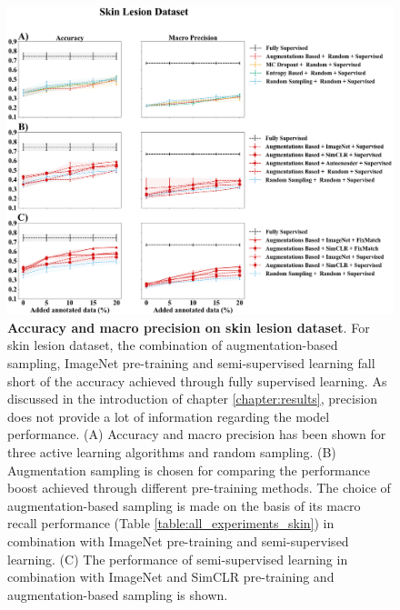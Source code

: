 \begin{figure}[htbp]
\centering
\captionsetup{format=plain}
\includegraphics[width=\textwidth]{figures/fig_2_skin_acc_precision.png}
\caption[Accuracy and macro precision on skin lesion dataset]{\textbf{Accuracy and macro precision on skin lesion dataset}. For skin lesion dataset, the combination of augmentation-based sampling, ImageNet pre-training and semi-supervised learning fall short of the accuracy achieved through fully supervised learning. As discussed in the introduction of chapter \ref{chapter:results}, precision does not provide a lot of information regarding the model performance. (A) Accuracy and macro precision has been shown for three active learning algorithms and random sampling. (B) Augmentation sampling is chosen for comparing the performance boost achieved through different pre-training methods. The choice of augmentation-based sampling is made on the basis of its macro recall performance (Table \ref{table:all_experiments_skin}) in combination with ImageNet pre-training and semi-supervised learning. (C) The performance of semi-supervised learning in combination with ImageNet and SimCLR pre-training and augmentation-based sampling is shown.}
\label{fig:fig_2_skin_acc_precision}
\end{figure}

